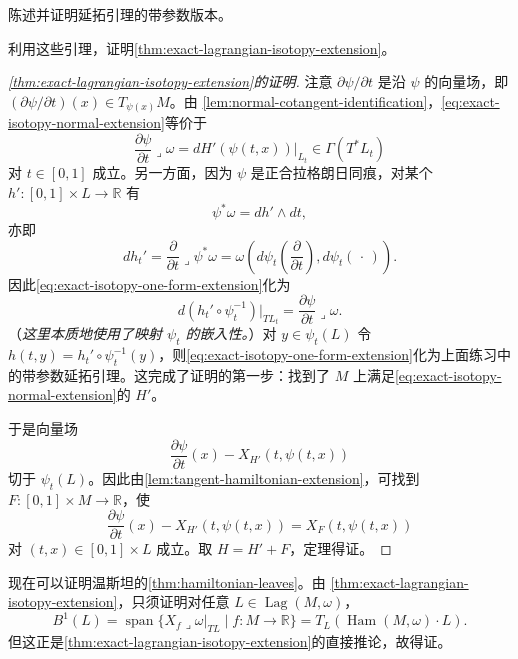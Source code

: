 \begin{exercise}\label{ex:parametrized-extension-lemma}
陈述并证明延拓引理的带参数版本。
\end{exercise}

利用这些引理，证明\cref{thm:exact-lagrangian-isotopy-extension}。

\begin{proof}[\cref{thm:exact-lagrangian-isotopy-extension}的证明]
注意 $\partial\psi/\partial t$ 是沿 $\psi$ 的向量场，即
$(\partial\psi/\partial t)(x)\in T_{\psi(x)}M$。由
\cref{lem:normal-cotangent-identification}，\eqref{eq:exact-isotopy-normal-extension}等价于
\begin{equation}
 \frac{\partial\psi}{\partial t}\mathbin{\lrcorner}\omega
 =dH'(\psi(t,x))|_{L_t}\in\Gamma(T^*L_t)
 \label{eq:exact-isotopy-one-form-extension}
\end{equation}
对 $t\in[0,1]$ 成立。另一方面，因为 $\psi$ 是正合拉格朗日同痕，对某个
$h':[0,1]\times L\to\mathbb R$ 有
\[
 \psi^*\omega=dh'\wedge dt,
\]
亦即
\[
 dh_t'=\frac\partial{\partial t}\mathbin{\lrcorner}\psi^*\omega
 =\omega\left(d\psi_t\!\left(\frac\partial{\partial t}\right),
 d\psi_t(\,\cdot\,)\right).
\]
因此\eqref{eq:exact-isotopy-one-form-extension}化为
\[
 d(h_t'\circ\psi_t^{-1})|_{TL_t}
 =\frac{\partial\psi}{\partial t}\mathbin{\lrcorner}\omega.
\]
（\emph{这里本质地使用了映射 $\psi_t$ 的嵌入性。}）对 $y\in\psi_t(L)$ 令
$h(t,y)=h_t'\circ\psi_t^{-1}(y)$，则\eqref{eq:exact-isotopy-one-form-extension}化为上面练习中的带参数延拓引理。这完成了证明的第一步：找到了 $M$ 上满足\eqref{eq:exact-isotopy-normal-extension}的 $H'$。

于是向量场
\[
 \frac{\partial\psi}{\partial t}(x)-X_{H'}(t,\psi(t,x))
\]
切于 $\psi_t(L)$。因此由\cref{lem:tangent-hamiltonian-extension}，可找到
$F:[0,1]\times M\to\mathbb R$，使
\[
 \frac{\partial\psi}{\partial t}(x)-X_{H'}(t,\psi(t,x))
 =X_F(t,\psi(t,x))
\]
对 $(t,x)\in[0,1]\times L$ 成立。取 $H=H'+F$，定理得证。
\end{proof}

现在可以证明温斯坦的\cref{thm:hamiltonian-leaves}。由
\cref{thm:exact-lagrangian-isotopy-extension}，只须证明对任意
$L\in\operatorname{Lag}(M,\omega)$，
\[
 B^1(L)=\operatorname{span}\{X_f\mathbin{\lrcorner}\omega|_{TL}
       \mid f:M\to\mathbb R\}
 =T_L(\operatorname{Ham}(M,\omega)\cdot L).
\]
但这正是\cref{thm:exact-lagrangian-isotopy-extension}的直接推论，故得证。
